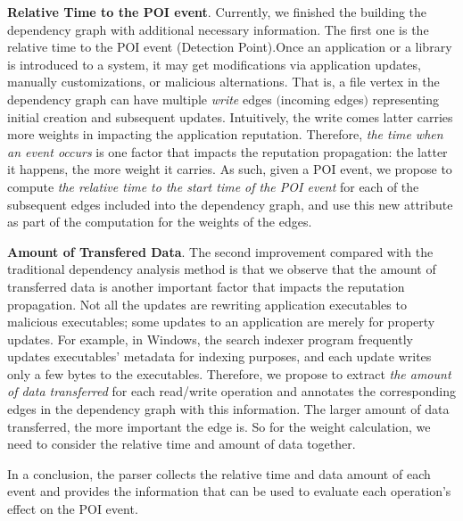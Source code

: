\textbf{Relative Time to the POI event}.
Currently, we finished the building the dependency graph with additional necessary information. The first one is the relative time to the POI event (Detection Point).Once an application or a library is introduced to a system, it may get modifications via application updates, manually customizations, or malicious alternations. 
That is, a file vertex in the dependency graph can have multiple \emph{write} edges $($incoming edges$)$ representing initial creation and subsequent updates.
Intuitively, the write comes latter carries more weights in impacting the application reputation.
Therefore, \emph{the time when an event occurs} is one factor that impacts the reputation propagation: the latter it happens, the more weight it carries.
As such, given a POI event, we propose to compute \emph{the relative time to the start time of the POI event} for each of the subsequent edges included into the dependency graph,
and use this new attribute as part of the computation for the weights of the edges. 

\textbf{Amount of Transfered Data}.
The second  improvement compared with the traditional dependency analysis method is that we observe that the amount of transferred data is another important factor that impacts the reputation propagation. Not all the updates are rewriting application executables to malicious executables; some updates to an application are merely for property updates.
For example, in Windows, the search indexer program frequently updates executables' metadata for indexing purposes, and each update writes only a few bytes to the executables.
Therefore, we propose to extract \emph{the amount of data transferred} for each read/write operation and annotates the corresponding edges in the dependency graph with this information.
The larger amount of data transferred, the more important the edge is. So for the weight calculation, we need to consider the relative time and amount of data together.

In a conclusion, the parser collects the relative time and data amount of each event and provides the information that can be used to evaluate each operation's effect on the POI event.  

